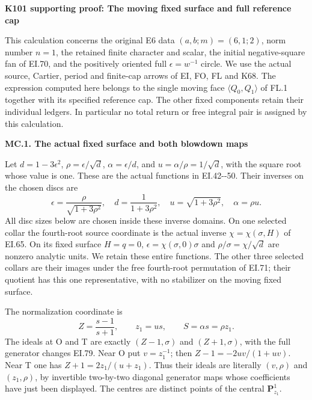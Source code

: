 \par\bigskip\noindent\textbf{K101 supporting proof: The moving fixed surface and full reference cap}\par\nobreak
This calculation concerns the original E6 data \((a,b;m)=(6,1;2)\),
norm number \(n=1\), the retained finite character and scalar, the
initial negative-square fan of EI.70, and the positively oriented
full \(\epsilon=w^{-1}\) circle. We use the actual source, Cartier,
period and finite-cap arrows of EI, FO, FL and K68. The expression
computed here belongs to the single moving face \(\langle Q_0,Q_1\rangle\)
of FL.1 together with its specified reference cap. The other fixed
components retain their individual ledgers. In particular no total
return or free integral pair is assigned by this calculation.

\par

\medskip\noindent\textbf{MC.1. The actual fixed surface and both blowdown maps}

\par\nobreak

Let \(d=1-3\epsilon^2\),
\(\rho=\epsilon/\sqrt d\), \(\alpha=\epsilon/d\), and
\(u=\alpha/\rho=1/\sqrt d\), with the square root whose value is
one. These are the actual functions in EI.42-\/-50. Their inverses
on the chosen discs are
\[
 \epsilon=\frac{\rho}{\sqrt{1+3\rho^2}},\quad
 d=\frac1{1+3\rho^2},\quad
 u=\sqrt{1+3\rho^2},\quad \alpha=\rho u.       \tag{MC.1}
\]
All disc sizes below are chosen inside these inverse domains.
On one selected collar the fourth-root source coordinate is the
actual inverse \(\chi=\chi(\sigma,H)\) of EI.65. On its fixed
surface \(H=q=0\),
\(\epsilon=\chi(\sigma,0)\sigma\) and
\(\rho/\sigma=\chi/\sqrt d\) are nonzero analytic units. We
retain these entire functions. The other three selected collars
are their images under the free fourth-root permutation of EI.71;
their quotient has this one representative, with no stabilizer
on the moving fixed surface.

The normalization coordinate is
\[
 Z=\frac{s-1}{s+1},\qquad z_1=u s,\qquad S=\alpha s=\rho z_1.
                                                        \tag{MC.2}
\]
The ideals at O and T are exactly \((Z-1,\sigma)\) and
\((Z+1,\sigma)\), with the full generator changes EI.79.
Near O put \(v=z_1^{-1}\); then
\(Z-1=-2uv/(1+uv)\). Near T one has
\(Z+1=2z_1/(u+z_1)\). Thus their ideals are literally
\((v,\rho)\) and \((z_1,\rho)\), by invertible two-by-two
diagonal generator maps whose coefficients have just been
displayed. The centres are distinct points of the central
\(\mathbf P^1_{z_1}\).

